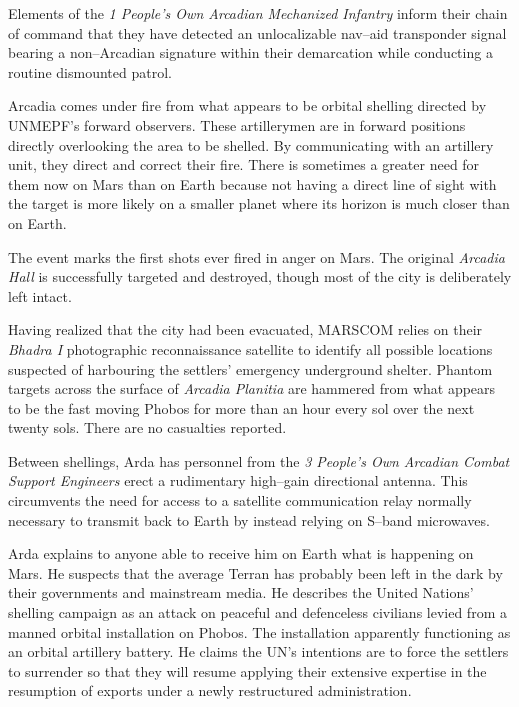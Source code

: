 

Elements of the {\it 1 People's Own Arcadian Mechanized Infantry} inform their chain of command that they have detected an unlocalizable nav--aid transponder signal bearing a non--Arcadian signature within their demarcation while conducting a routine dismounted patrol.
\StopTimelineDate

Arcadia comes under fire from what appears to be orbital shelling directed by UNMEPF's forward observers. These artillerymen are in forward positions directly overlooking the area to be shelled. By communicating with an artillery unit, they direct and correct their fire. There is sometimes a greater need for them now on Mars than on Earth because not having a direct line of sight with the target is more likely on a smaller planet where its horizon is much closer than on Earth. 

The event marks the first shots ever fired in anger on Mars. The original {\it Arcadia Hall} is successfully targeted and destroyed, though most of the city is deliberately left intact. 

Having realized that the city had been evacuated, MARSCOM relies on their {\it Bhadra I} photographic reconnaissance satellite to identify all possible locations suspected of harbouring the settlers' emergency underground shelter. Phantom targets across the surface of {\it Arcadia Planitia} are hammered from what appears to be the fast moving Phobos for more than an hour every sol over the next twenty sols. There are no casualties reported.

Between shellings, Arda has personnel from the {\it 3 People's Own Arcadian Combat Support Engineers} erect a rudimentary high--gain directional antenna. This circumvents the need for access to a satellite communication relay normally necessary to transmit back to Earth by instead relying on S--band microwaves. 

Arda explains to anyone able to receive him on Earth what is happening on Mars. He suspects that the average Terran has probably been left in the dark by their governments and mainstream media. He describes the United Nations' shelling campaign as an attack on peaceful and defenceless civilians levied from a manned orbital installation on Phobos. The installation apparently functioning as an orbital artillery battery. He claims the UN's intentions are to force the settlers to surrender so that they will resume applying their extensive expertise in the resumption of exports under a newly restructured administration.

